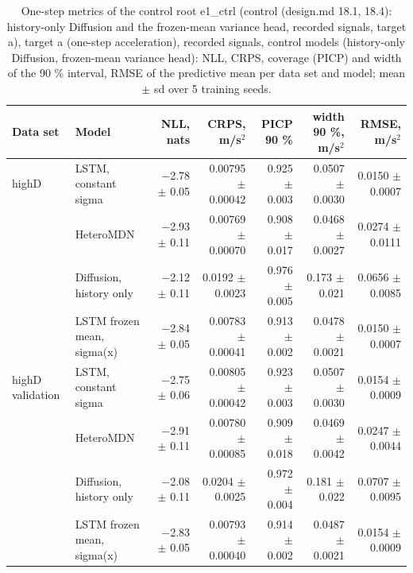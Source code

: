 \begin{table}[htbp]
\centering
\footnotesize
\caption{One-step metrics of the control root e1\_ctrl (control (design.md 18.1, 18.4): history-only Diffusion and the frozen-mean variance head, recorded signals, target a), target a (one-step acceleration), recorded signals, control models (history-only Diffusion, frozen-mean variance head): NLL, CRPS, coverage (PICP) and width of the 90 \% interval, RMSE of the predictive mean per data set and model; mean $\pm$ sd over 5 training seeds.}
\label{tab:t1-one-step--ctrl--a}
\begin{tabular}{llrrrrr}
\toprule
Data set & Model & NLL, nats & CRPS, m/s$^2$ & PICP 90 \% & width 90 \%, m/s$^2$ & RMSE, m/s$^2$ \\
\midrule
highD & LSTM, constant sigma & $-$2.78 $\pm$ 0.05 & 0.00795 $\pm$ 0.00042 & 0.925 $\pm$ 0.003 & 0.0507 $\pm$ 0.0030 & 0.0150 $\pm$ 0.0007 \\
 & HeteroMDN & $-$2.93 $\pm$ 0.11 & 0.00769 $\pm$ 0.00070 & 0.908 $\pm$ 0.017 & 0.0468 $\pm$ 0.0027 & 0.0274 $\pm$ 0.0111 \\
 & Diffusion, history only & $-$2.12 $\pm$ 0.11 & 0.0192 $\pm$ 0.0023 & 0.976 $\pm$ 0.005 & 0.173 $\pm$ 0.021 & 0.0656 $\pm$ 0.0085 \\
 & LSTM frozen mean, sigma(x) & $-$2.84 $\pm$ 0.05 & 0.00783 $\pm$ 0.00041 & 0.913 $\pm$ 0.002 & 0.0478 $\pm$ 0.0021 & 0.0150 $\pm$ 0.0007 \\
\midrule
highD validation & LSTM, constant sigma & $-$2.75 $\pm$ 0.06 & 0.00805 $\pm$ 0.00042 & 0.923 $\pm$ 0.003 & 0.0507 $\pm$ 0.0030 & 0.0154 $\pm$ 0.0009 \\
 & HeteroMDN & $-$2.91 $\pm$ 0.11 & 0.00780 $\pm$ 0.00085 & 0.909 $\pm$ 0.018 & 0.0469 $\pm$ 0.0042 & 0.0247 $\pm$ 0.0044 \\
 & Diffusion, history only & $-$2.08 $\pm$ 0.11 & 0.0204 $\pm$ 0.0025 & 0.972 $\pm$ 0.004 & 0.181 $\pm$ 0.022 & 0.0707 $\pm$ 0.0095 \\
 & LSTM frozen mean, sigma(x) & $-$2.83 $\pm$ 0.05 & 0.00793 $\pm$ 0.00040 & 0.914 $\pm$ 0.002 & 0.0487 $\pm$ 0.0021 & 0.0154 $\pm$ 0.0009 \\

\end{tabular}
\end{table}
